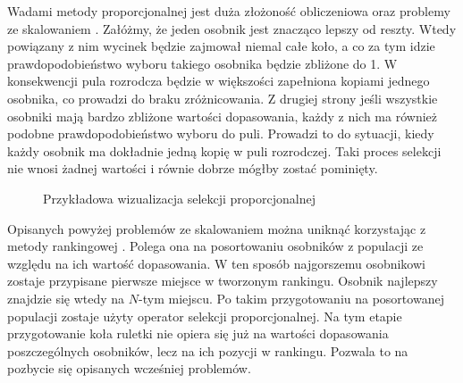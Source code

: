 \documentclass[twoside]{iisthesis}
\begin{document}
Wadami metody proporcjonalnej jest duża złożoność obliczeniowa oraz problemy ze skalowaniem \cite{book}. Załóżmy, że jeden osobnik jest znacząco lepszy od reszty. Wtedy powiązany z nim wycinek będzie zajmował niemal całe koło, a co za tym idzie prawdopodobieństwo wyboru takiego osobnika będzie zbliżone do 1. W konsekwencji pula rozrodcza będzie w większości zapełniona kopiami jednego osobnika, co prowadzi do braku zróżnicowania. Z drugiej strony jeśli wszystkie osobniki mają bardzo zbliżone wartości dopasowania, każdy z nich ma również podobne prawdopodobieństwo wyboru do puli. Prowadzi to do sytuacji, kiedy każdy osobnik ma dokładnie jedną kopię w puli rozrodczej. Taki proces selekcji nie wnosi żadnej wartości i równie dobrze mógłby zostać pominięty. 
\begin{figure}[!htb]
	\centering
	\caption{Przykładowa wizualizacja selekcji proporcjonalnej}
	\label{fig:roulette}
\end{figure}

Opisanych powyżej problemów ze skalowaniem można uniknąć korzystając z metody rankingowej \cite{book}. Polega ona na posortowaniu osobników z populacji ze względu na ich wartość dopasowania. W ten sposób najgorszemu osobnikowi zostaje przypisane pierwsze miejsce w tworzonym rankingu. Osobnik najlepszy znajdzie się wtedy na $N$-tym miejscu. Po takim przygotowaniu na posortowanej populacji zostaje użyty operator selekcji proporcjonalnej. Na tym etapie przygotowanie koła ruletki nie opiera się już na wartości dopasowania poszczególnych osobników, lecz na ich pozycji w rankingu. Pozwala to na pozbycie się opisanych wcześniej problemów.
\end{document}
